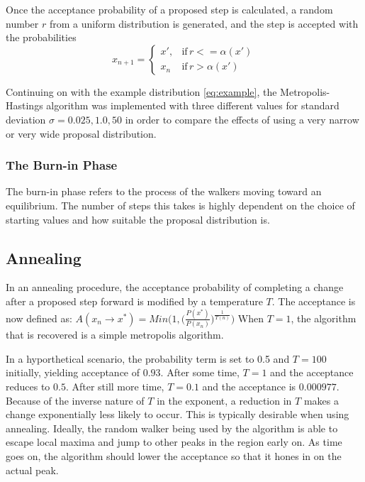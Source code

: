 \documentclass[twocolumn]{article}
\begin{document}
Once the acceptance probability of a proposed step is calculated, a random
number $r$ from a uniform distribution is generated, and the step is accepted
with the probabilities
\begin{equation}
  x_{n+1} = \left\{
    \begin{array}{lr}
      x', & \text{if} \, r <= \alpha(x') \\
      x_n & \text{if} \, r > \alpha(x')
    \end{array}
  \right.
\end{equation}

Continuing on with the example distribution \ref{eq:example}, the
Metropolis-Hastings algorithm was implemented with three different values for
standard deviation $\sigma = 0.025, 1.0, 50$ in order to compare the effects of
using a very narrow or very wide proposal distribution.


\subsubsection{The Burn-in Phase}
The burn-in phase refers to the process of the walkers moving toward an
equilibrium. The number of steps this takes is highly dependent on the choice of
starting values and how suitable the proposal distribution is. 

\subsection{Annealing}
In an annealing procedure, the acceptance probability of completing a change after a proposed step forward is modified by a temperature $T$. The acceptance is now defined as:
$A(x_n \to x^*) = Min \Bigg( 1, \Big( \frac{P(x^*)}{P(x_n)}\Big) ^{ \frac{1}{T(n)} } \Bigg)$
When $T=1$, the algorithm that is recovered is a simple metropolis algorithm. 

In a hyporthetical scenario, the probability term is set to 0.5 and $T=100$ initially, yielding acceptance of $0.93$. After some time, $T=1$ and the acceptance reduces to $0.5$. After still more time, $T=0.1$ and the acceptance is $0.000977$. Because of the inverse nature of $T$ in the exponent, a reduction in $T$ makes a change exponentially less likely to occur. This is typically desirable when using annealing. Ideally, the random walker being used by the algorithm is able to escape local maxima and jump to other peaks in the region early on. As time goes on, the algorithm should lower the acceptance so that it hones in on the actual peak.
\end{document}

